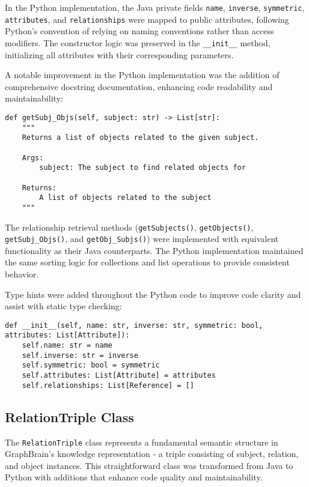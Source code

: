 \documentclass[12pt,a4paper]{article}
\begin{document}
In the Python implementation, the Java private fields \texttt{name}, \texttt{inverse}, \texttt{symmetric}, \texttt{attributes}, and \texttt{relationships} were mapped to public attributes, following Python's convention of relying on naming conventions rather than access modifiers. The constructor logic was preserved in the \texttt{\_\_init\_\_} method, initializing all attributes with their corresponding parameters.

A notable improvement in the Python implementation was the addition of comprehensive docstring documentation, enhancing code readability and maintainability:

\begin{verbatim}
def getSubj_Objs(self, subject: str) -> List[str]:
    """
    Returns a list of objects related to the given subject.
    
    Args:
        subject: The subject to find related objects for
        
    Returns:
        A list of objects related to the subject
    """
\end{verbatim}

The relationship retrieval methods (\texttt{getSubjects()}, \texttt{getObjects()}, \texttt{getSubj\_Objs()}, and \texttt{getObj\_Subjs()}) were implemented with equivalent functionality as their Java counterparts. The Python implementation maintained the same sorting logic for collections and list operations to provide consistent behavior.

Type hints were added throughout the Python code to improve code clarity and assist with static type checking:

\begin{verbatim}
def __init__(self, name: str, inverse: str, symmetric: bool, attributes: List[Attribute]):
    self.name: str = name
    self.inverse: str = inverse
    self.symmetric: bool = symmetric
    self.attributes: List[Attribute] = attributes
    self.relationships: List[Reference] = []
\end{verbatim}


\subsection{RelationTriple Class}
The \texttt{RelationTriple} class represents a fundamental semantic structure in GraphBrain's knowledge representation - a triple consisting of subject, relation, and object instances. This straightforward class was transformed from Java to Python with additions that enhance code quality and maintainability.
\end{document}
